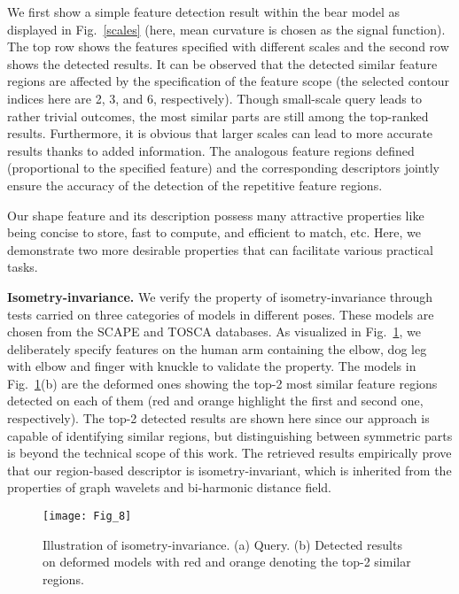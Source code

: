 We first show a simple feature detection result within the bear model
as displayed in Fig.~\ref{scales} (here, mean curvature is chosen as
the signal function). The top row shows the features specified with
different scales and the second row shows the detected results. It can
be observed that the detected similar feature regions are affected by
the specification of the feature scope (the selected contour indices
here are 2, 3, and 6, respectively). Though small-scale query leads to
rather trivial outcomes, the most similar parts are still among the
top-ranked results. Furthermore, it is obvious that larger scales can
lead to more accurate results thanks to added information. The
analogous feature regions defined (proportional to the specified
feature) and the corresponding descriptors jointly ensure the accuracy
of the detection of the repetitive feature regions.

Our shape feature and its description possess many attractive
properties like being concise to store, fast to compute, and efficient
to match, etc. Here, we demonstrate two more desirable properties that
can facilitate various practical tasks.

\textbf{Isometry-invariance.} We verify the property of
isometry-invariance through tests carried on three categories of
models in different poses. These models are chosen from the SCAPE and
TOSCA databases. As visualized in Fig.~\ref{pose-human}, we
deliberately specify features on the human arm containing the elbow,
dog leg with elbow and finger with knuckle to validate the property.
The models in Fig.~\ref{pose-human}(b) are the deformed ones showing
the top-2 most similar feature regions detected on each of them (red
and orange highlight the first and second one, respectively). The
top-2 detected results are shown here since our approach is capable
of identifying similar regions, but distinguishing between symmetric
parts is beyond the technical scope of this work. The retrieved
results empirically prove that our region-based descriptor is
isometry-invariant, which is inherited from the properties of graph
wavelets and bi-harmonic distance field.

\begin{figure}[!to]
\texttt{[image: Fig\_8]}
\caption[Illustration of the isometry-invariance property.]
  {Illustration of isometry-invariance. (a) Query. (b) Detected
  results on deformed models with red and orange denoting the top-2
  similar regions.}
\label{pose-human}
\end{figure}

